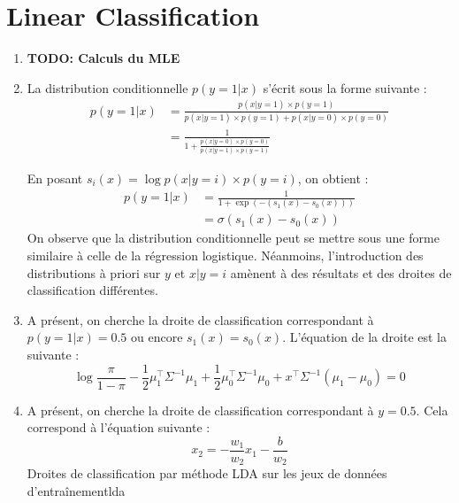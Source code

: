 \documentclass{article}
\begin{document}
\section{Linear Classification}


\begin{enumerate}[label=(\alph*)]
\item \textbf{TODO: Calculs du MLE}

\item La distribution conditionnelle $p(y=1|x)$ s'écrit sous la forme suivante :
\begin{align*}
p(y=1|x) &= \frac{p(x|y=1)\times p(y=1)}{p(x|y=1)\times p(y=1) + p(x|y=0)\times p(y=0)}\\
&= \frac{1}{1 + \frac{p(x|y=0)\times p(y=0)}{p(x|y=1)\times p(y=1)}}
\end{align*}

En posant $s_i(x) = \log p(x|y=i)\times p(y=i)$, on obtient :
\begin{align*}
p(y=1|x) &= \frac{1}{1 + \exp(-(s_1(x)-s_0(x)))}\\
&= \sigma(s_1(x)-s_0(x))
\end{align*}
On observe que la distribution conditionnelle peut se mettre sous une forme similaire à celle de la régression logistique. Néanmoins, l'introduction des distributions à priori sur $y$ et $x|y=i$ amènent à des résultats et des droites de classification différentes.

\item A présent, on cherche la droite de classification correspondant à $p(y=1|x) = 0.5$ ou encore $s_1(x) = s_0(x)$. L'équation de la droite est la suivante :
$$
\log\frac{\pi}{1-\pi} - \frac{1}{2}\mu_1^\intercal \Sigma^{-1} \mu_1 + \frac{1}{2}\mu_0^\intercal \Sigma^{-1}\mu_0 + x^\intercal \Sigma^{-1}(\mu_1 - \mu_0) = 0
$$
\item A présent, on cherche la droite de classification correspondant à $y = 0.5$. Cela correspond à l'équation suivante :
$$ x_2 = -\frac{w_1}{w_2}x_1 - \frac{b}{w_2} $$
          {}
          {}
          {Droites de classification par méthode LDA sur les jeux de données d'entraînement}{lda}
\end{enumerate}

\end{document}
